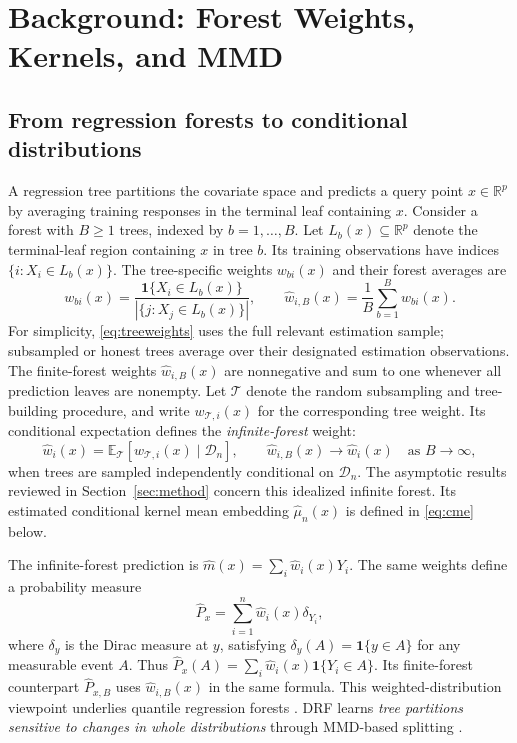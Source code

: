 \documentclass[12pt,a4paper]{article}
\newcommand{\E}{\mathbb E}
\newcommand{\R}{\mathbb R}
\newcommand{\1}{\mathbf 1}
\begin{document}
\section{Background: Forest Weights, Kernels, and MMD}\label{sec:background}
\subsection{From regression forests to conditional distributions}
A regression tree partitions the covariate space and predicts a query point $x\in\R^p$ by averaging training responses in the terminal leaf containing $x$. Consider a forest with $B\ge1$ trees, indexed by $b=1,\ldots,B$. Let $L_b(x)\subseteq\R^p$ denote the terminal-leaf region containing $x$ in tree $b$. Its training observations have indices $\{i:X_i\in L_b(x)\}$. The tree-specific weights $w_{bi}(x)$ and their forest averages are
\begin{equation}\label{eq:treeweights}
 w_{bi}(x)=\frac{\1\{X_i\in L_b(x)\}}{|\{j:X_j\in L_b(x)\}|},\qquad
 \widehat w_{i,B}(x)=\frac{1}{B}\sum_{b=1}^{B}w_{bi}(x).
\end{equation}
For simplicity, \eqref{eq:treeweights} uses the full relevant estimation sample; subsampled or honest trees average over their designated estimation observations. The finite-forest weights $\widehat w_{i,B}(x)$ are nonnegative and sum to one whenever all prediction leaves are nonempty. Let $\mathcal T$ denote the random subsampling and tree-building procedure, and write $w_{\mathcal T,i}(x)$ for the corresponding tree weight. Its conditional expectation defines the \emph{infinite-forest} weight:
\[
 \widehat w_i(x)=\E_{\mathcal T}[w_{\mathcal T,i}(x)\mid\mathcal D_n],
 \qquad \widehat w_{i,B}(x)\longrightarrow\widehat w_i(x)
 \quad\text{as }B\to\infty,
\]
when trees are sampled independently conditional on $\mathcal D_n$. The asymptotic results reviewed in Section~\ref{sec:method} concern this idealized infinite forest. Its estimated conditional kernel mean embedding $\widehat\mu_n(x)$ is defined in \eqref{eq:cme} below.

The infinite-forest prediction is $\widehat m(x)=\sum_i\widehat w_i(x)Y_i$. The same weights define a probability measure
\begin{equation}\label{eq:weightedlaw}
 \widehat P_x=\sum_{i=1}^n\widehat w_i(x)\delta_{Y_i},
\end{equation}
where $\delta_y$ is the Dirac measure at $y$, satisfying $\delta_y(A)=\1\{y\in A\}$ for any measurable event $A$. Thus $\widehat P_x(A)=\sum_i\widehat w_i(x)\1\{Y_i\in A\}$. Its finite-forest counterpart $\widehat P_{x,B}$ uses $\widehat w_{i,B}(x)$ in the same formula. This weighted-distribution viewpoint underlies quantile regression forests \cite{meinshausen2006}. DRF learns \emph{tree partitions sensitive to changes in whole distributions} through MMD-based splitting \cite{cevid2022}.
\end{document}
